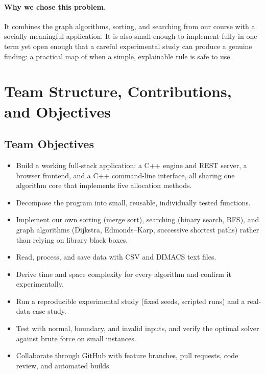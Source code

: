 \documentclass[11pt]{article}
\begin{document}
\paragraph{Why we chose this problem.}
It combines the graph algorithms, sorting, and searching from our course with
a socially meaningful application. It is also small enough to implement fully
in one term yet open enough that a careful experimental study can produce a
genuine finding: a practical map of when a simple, explainable rule is safe to
use.

\section{Team Structure, Contributions, and Objectives}

\subsection*{Team Objectives}
\begin{itemize}
  \item Build a working full-stack application: a C++ engine and REST
        server, a browser frontend, and a C++ command-line interface, all
        sharing one algorithm core that implements five allocation methods.
  \item Decompose the program into small, reusable, individually tested
        functions.
  \item Implement our own sorting (merge sort), searching (binary search,
        BFS), and graph algorithms (Dijkstra, Edmonds--Karp, successive
        shortest paths) rather than relying on library black boxes.
  \item Read, process, and save data with CSV and DIMACS text files.
  \item Derive time and space complexity for every algorithm and confirm it
        experimentally.
  \item Run a reproducible experimental study (fixed seeds, scripted runs)
        and a real-data case study.
  \item Test with normal, boundary, and invalid inputs, and verify the
        optimal solver against brute force on small instances.
  \item Collaborate through GitHub with feature branches, pull requests,
        code review, and automated builds.
\end{itemize}
\end{document}
